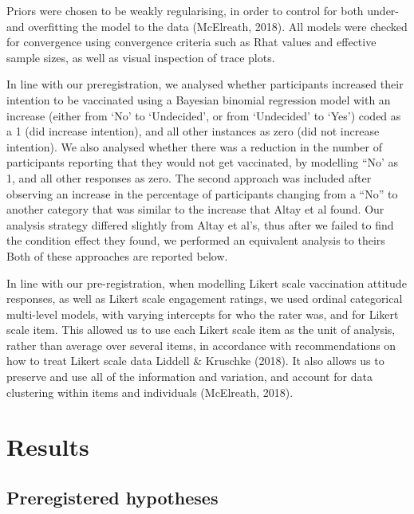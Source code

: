\documentclass[
  english,
  ,jou,floatsintext]{apa6}
\begin{document}
Priors were chosen to be weakly regularising, in order to control for both under- and overfitting the model to the data (McElreath, 2018). All models were checked for convergence using convergence criteria such as Rhat values and effective sample sizes, as well as visual inspection of trace plots.

In line with our preregistration, we analysed whether participants increased their intention to be vaccinated using a Bayesian binomial regression model with an increase (either from `No' to `Undecided', or from `Undecided' to `Yes') coded as a 1 (did increase intention), and all other instances as zero (did not increase intention). We also analysed whether there was a reduction in the number of participants reporting that they would not get vaccinated, by modelling ``No' as 1, and all other responses as zero. The second approach was included after observing an increase in the percentage of participants changing from a ``No'' to another category that was similar to the increase that Altay et al found. Our analysis strategy differed slightly from Altay et al's, thus after we failed to find the condition effect they found, we performed an equivalent analysis to theirs Both of these approaches are reported below.

In line with our pre-registration, when modelling Likert scale vaccination attitude responses, as well as Likert scale engagement ratings, we used ordinal categorical multi-level models, with varying intercepts for who the rater was, and for Likert scale item. This allowed us to use each Likert scale item as the unit of analysis, rather than average over several items, in accordance with recommendations on how to treat Likert scale data Liddell \& Kruschke (2018). It also allows us to preserve and use all of the information and variation, and account for data clustering within items and individuals (McElreath, 2018).

\hypertarget{results}{%
\section{Results}\label{results}}

\hypertarget{preregistered-hypotheses-1}{%
\subsection{Preregistered hypotheses}\label{preregistered-hypotheses-1}}
\end{document}
